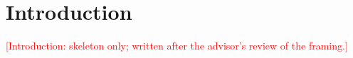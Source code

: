 \section{Introduction}\label{sec:intro}
\textcolor{red}{[Introduction: skeleton only; written after the advisor's review of the framing.]}
